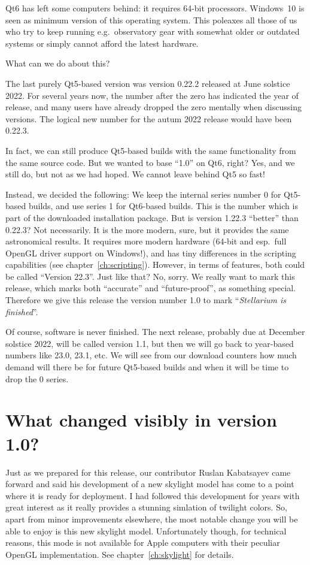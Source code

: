Qt6 has left some computers behind: it requires 64-bit
processors. Windows~10 is seen as minimum version of this operating
system. This poleaxes all those of us who try to keep running
e.g.\ observatory gear with somewhat older or outdated systems or
simply cannot afford the latest hardware.

What can we do about this?


The last purely Qt5-based version was version 0.22.2 released at June
solstice 2022. For several years now, the number after the zero has
indicated the year of release, and many users have already dropped the
zero mentally when discussing versions.  The logical new number for
the autum 2022 release would have been 0.22.3.

In fact, we can still produce Qt5-based builds with the same
functionality from the same source code. But we wanted to base ``1.0''
on Qt6, right? Yes, and we still do, but not as we had hoped. We
cannot leave behind Qt5 so fast!


Instead, we decided the following: We keep the internal series
number 0 for Qt5-based builds, and use series 1 for Qt6-based
builds. This is the number which is part of the downloaded
installation package.  But is version 1.22.3 ``better'' than 0.22.3?
Not necessarily. It is the more modern, sure, but it provides the same
astronomical results. It requires more modern hardware (64-bit and
esp.\ full OpenGL driver support on Windows!), and has tiny
differences in the scripting capabilities (see
chapter~\ref{ch:scripting}). However, in terms of features, both could
be called ``Version 22.3''. Just like that? No, sorry.
We really want to mark this release, which marks both ``accurate'' and
``future-proof'', as something special. Therefore we give this release
the version number 1.0 to mark ``\emph{Stellarium is finished}''.

Of course, software is never finished. The next release, probably due
at December solstice 2022, will be called version 1.1, but then we
will go back to year-based numbers like 23.0, 23.1, etc. We will see
from our download counters how much demand will there be for future
Qt5-based builds and when it will be time to drop the 0 series. 


\section*{What changed visibly in version 1.0?}

Just as we prepared for this release, our contributor Ruslan
Kabatsayev came forward and said his development of a new skylight
model has come to a point where it is ready for deployment. I had
followed this development for years with great interest as it really
provides a stunning simlation of twilight colors. So, apart from minor
improvements elsewhere, the most notable change you will be able to
enjoy is this new skylight model. Unfortunately though, for technical
reasons, this mode is not available for Apple computers with their
peculiar OpenGL implementation.  See chapter~\ref{ch:skylight} for
details.

